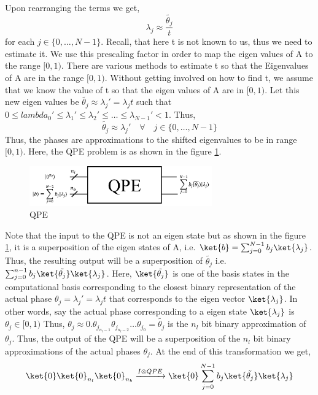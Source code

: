 \documentclass[12pt, oneside]{book}
\theoremstyle{definition}
\theoremstyle{definition}
\theoremstyle{remark}
\begin{document}
\begin{enumerate}
    Upon rearranging the terms we get,
    \[
        \lambda_j \approx \frac{\tilde{\theta_j}}{t}
    \]
    for each $j \in \{0,\ldots,N-1\}$. Recall, that here t is not known to us, thus we need to estimate it.
    We use this prescaling factor in order to map the eigen values of A to the range $[0,1)$. There are various methods to estimate t so that the Eigenvalues of A are in the range $[0,1)$. Without getting involved on how to find t, we assume that we know the value of t so that the eigen values of A are in $[0,1)$. Let this new eigen values be $\tilde{\theta_j} \approx \lambda_j'=\lambda_j t$ such that $0 \leq lambda_0'\leq \lambda_1' \leq \lambda_2' \leq \ldots \leq\lambda_{N-1}' < 1$. Thus,
    \[
    \tilde{\theta_j} \approx \lambda_j' \quad \forall \quad j \in \{0,\ldots,N-1\}
    \]
    Thus, the phases are approximations to the shifted eigenvalues to be in range $[0,1)$.
    Here, the QPE problem is as shown in the figure \ref{fig:qpe}.
    \begin{figure}[H]
        \centering
        \includegraphics[width=0.7\textwidth]{../images/qpe.png}
        \caption{QPE}
        \label{fig:qpe}
    \end{figure}
    Note that the input to the QPE is not an eigen state but as shown in the figure \ref{fig:qpe}, 
    it is a superposition of the eigen states of A, i.e. $\ket{b}=\sum_{j=0}^{N-1}b_j\ket{\lambda_j}$.
    Thus, the resulting output will be a superposition of $\tilde{\theta_j}$ i.e. $\sum_{j=0}^{n-1}b_j\ket{\tilde{\theta_j}}\ket{\lambda_j}$.
    Here, $\ket{\tilde{\theta_j}}$ is one of the basis states in the computational basis corresponding to the 
    closest binary representation of the actual phase $\theta_j=\lambda_j'=\lambda_jt$ that corresponds to the eigen vector $\ket{\lambda_j}$.
    In other words, say the actual phase corresponding to a eigen state $\ket{\lambda_j}$ is $\theta_j \in [0,1)$
    Thus, $\theta_j\approx 0.\theta_{j_{n_l-1}}\theta_{j_{n_l-2}}\ldots\theta_{j_0}=\tilde{\theta_j}$ is the $n_l$ bit binary approximation of $\theta_j$.
    Thus, the output of the QPE will be a superposition of the $n_l$ bit binary approximations of the actual phases $\theta_j$.
    At the end of this transformation we get,
    \[
        \ket{0}\ket{0}_{n_l}\ket{0}_{n_b} \xrightarrow{I\otimes QPE}  \ket{0}\sum_{j=0}^{N-1}b_j\ket{\tilde{\theta_j}}\ket{\lambda_j}
\]
\end{enumerate}
\end{document}

